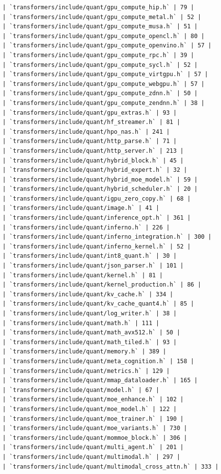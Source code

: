 \begin{Verbatim}[breaklines,breakanywhere,fontsize=\footnotesize]
| `transformers/include/quant/gpu_compute_hip.h` | 79 |
| `transformers/include/quant/gpu_compute_metal.h` | 52 |
| `transformers/include/quant/gpu_compute_musa.h` | 51 |
| `transformers/include/quant/gpu_compute_opencl.h` | 80 |
| `transformers/include/quant/gpu_compute_openvino.h` | 57 |
| `transformers/include/quant/gpu_compute_rpc.h` | 39 |
| `transformers/include/quant/gpu_compute_sycl.h` | 52 |
| `transformers/include/quant/gpu_compute_virtgpu.h` | 57 |
| `transformers/include/quant/gpu_compute_webgpu.h` | 57 |
| `transformers/include/quant/gpu_compute_zdnn.h` | 50 |
| `transformers/include/quant/gpu_compute_zendnn.h` | 38 |
| `transformers/include/quant/gpu_extras.h` | 93 |
| `transformers/include/quant/hf_streamer.h` | 81 |
| `transformers/include/quant/hpo_nas.h` | 241 |
| `transformers/include/quant/http_parse.h` | 71 |
| `transformers/include/quant/http_server.h` | 213 |
| `transformers/include/quant/hybrid_block.h` | 45 |
| `transformers/include/quant/hybrid_expert.h` | 32 |
| `transformers/include/quant/hybrid_moe_model.h` | 59 |
| `transformers/include/quant/hybrid_scheduler.h` | 20 |
| `transformers/include/quant/igpu_zero_copy.h` | 68 |
| `transformers/include/quant/image.h` | 41 |
| `transformers/include/quant/inference_opt.h` | 361 |
| `transformers/include/quant/inferno.h` | 226 |
| `transformers/include/quant/inferno_integration.h` | 300 |
| `transformers/include/quant/inferno_kernel.h` | 52 |
| `transformers/include/quant/int8_quant.h` | 30 |
| `transformers/include/quant/json_parser.h` | 101 |
| `transformers/include/quant/kernel.h` | 81 |
| `transformers/include/quant/kernel_production.h` | 86 |
| `transformers/include/quant/kv_cache.h` | 334 |
| `transformers/include/quant/kv_cache_quant4.h` | 85 |
| `transformers/include/quant/log_writer.h` | 38 |
| `transformers/include/quant/math.h` | 111 |
| `transformers/include/quant/math_avx512.h` | 50 |
| `transformers/include/quant/math_tiled.h` | 93 |
| `transformers/include/quant/memory.h` | 389 |
| `transformers/include/quant/meta_cognition.h` | 158 |
| `transformers/include/quant/metrics.h` | 129 |
| `transformers/include/quant/mmap_dataloader.h` | 165 |
| `transformers/include/quant/model.h` | 67 |
| `transformers/include/quant/moe_enhance.h` | 102 |
| `transformers/include/quant/moe_model.h` | 122 |
| `transformers/include/quant/moe_trainer.h` | 190 |
| `transformers/include/quant/moe_variants.h` | 730 |
| `transformers/include/quant/mommoe_block.h` | 306 |
| `transformers/include/quant/multi_agent.h` | 201 |
| `transformers/include/quant/multimodal.h` | 297 |
| `transformers/include/quant/multimodal_cross_attn.h` | 333 |

\end{Verbatim}
